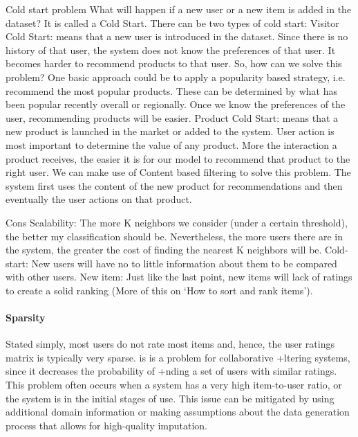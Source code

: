 Cold start problem
What will happen if a new user or a new item is added in the dataset? It is called a Cold Start. There can be two types of cold start:
	Visitor Cold Start: means that a new user is introduced in the dataset. Since there is no history of that user, the system does not 
know the preferences of that user. It becomes harder to recommend products to that user. So, how can we solve this problem? One basic
approach could be to apply a popularity based strategy, i.e. recommend the most popular products. These can be determined by what has
been popular recently overall or regionally. Once we know the preferences of the user, recommending products will be easier.
	Product Cold Start: means that a new product is launched in the market or added to the system. User action is most important to
determine the value of any product. More the interaction a product receives, the easier it is for our model to recommend that product
to the right user. We can make use of Content based filtering to solve this problem. The system first uses the content of the new 
product for recommendations and then eventually the user actions on that product.


  Cons
	Scalability: The more K neighbors we consider (under a certain threshold), the better my classification should be. 
  Nevertheless, the more users there are in the system, the greater the cost of finding the nearest K neighbors will be.
	Cold-start: New users will have no to little information about them to be compared with other users.
	New item: Just like the last point, new items will lack of ratings to create a solid ranking (More of this on ‘How to sort 
  and rank items’).

\paragraph{Sparsity}


Stated simply, most users do not rate most items and, hence, the user ratings matrix is typically very sparse. is is a problem for 
collaborative +ltering systems, since it decreases the probability of +nding a set of users with similar ratings. This problem often 
occurs when a system has a very high item-to-user ratio, or the system is in the initial stages of use. This issue can be mitigated by 
using additional domain information or making assumptions about the data generation process that allows for high-quality imputation.

